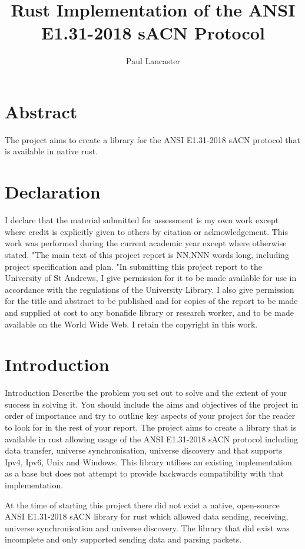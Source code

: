 \documentclass[11pt,a4paper]{article}
\author{Paul Lancaster}
\title{Rust Implementation of the ANSI E1.31-2018 sACN Protocol}
\begin{document}


\section{Abstract}
The project aims to create a library for the ANSI E1.31-2018 sACN protocol \cite{ANSI_E1.31} that is available in native rust.

\section{Declaration}
I declare that the material submitted for
assessment is my own work except where credit is
explicitly given to others by citation or
acknowledgement. This work was performed during
the current academic year except where otherwise
stated.
"The main text of this project report is NN,NNN
words long, including project specification and plan.
"In submitting this project report to the University of
St Andrews, I give permission for it to be made
available for use in accordance with the regulations of the University Library. I also give permission for
the title and abstract to be published and for copies of the report to be made and supplied at cost to any bonafide library or research worker, and to be made
available on the World Wide Web. I retain the
copyright in this work.

\pagebreak
\tableofcontents
\pagebreak

\section{Introduction}
	Introduction
	Describe the problem you set out to solve and the
	extent of your success in solving it. You should include
	the aims and objectives of the project in order of
	importance and try to outline key aspects of your
	project for the reader to look for in the rest of your
	report.
The project aims to create a library that is available in rust allowing usage of the ANSI E1.31-2018 sACN \cite{ANSI_E1.31} protocol including data transfer, universe synchronisation, universe discovery and that supports Ipv4, Ipv6, Unix and Windows. This library utilises an existing implementation \cite{ORIGINAL_IMPL} as a base but does not attempt to provide backwards compatibility with that implementation.
	
At the time of starting this project there did not exist a native, open-source ANSI E1.31-2018 sACN library for rust which allowed data sending, receiving, universe synchronisation and universe discovery.  The library that did exist was incomplete and only supported sending data and parsing packets.\\
\end{document}
